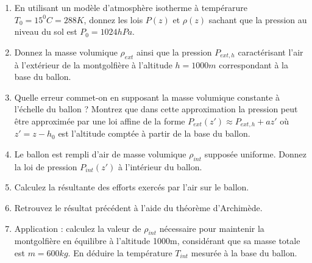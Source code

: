 \begin{enumerate}

\item En utilisant un modèle d'atmosphère isotherme à tempérarure $T_0 =15^0C = 288K$, donnez les lois $P(z)$ et $\rho(z)$ sachant que la pression au niveau du sol est $P_0 = 1024 hPa$.



\item Donnez la masse volumique 
$\rho_{ext}$ ainsi que la pression $P_{ext,h}$ caractérisant l'air à l'extérieur 
de la montgolfière à l'altitude $h = 1000m$ correspondant à la base du ballon.


\item
Quelle erreur commet-on en supposant la masse volumique constante à l'échelle du ballon ? 
Montrez que dans cette approximation la pression peut être approximée par une loi affine
de la forme $P_{ext}(z') \approx P_{ext,h}+a z'$ où $z' = z-h_0$ est l'altitude comptée à partir
de la base du ballon.

  
\item Le ballon est rempli d'air de masse volumique $\rho_{int}$ supposée uniforme.
Donnez la loi de pression $P_{int}(z')$ à l'intérieur du ballon.


\item Calculez la résultante des efforts exercés par l'air sur le ballon.


\item Retrouvez le résultat précédent à l'aide du théorème d'Archimède.


\item Application : calculez la valeur de $\rho_{int}$ nécessaire pour 
maintenir la montgolfière en équilibre à l'altitude 1000m, considérant que 
sa masse totale est $m=600kg$. En déduire la température $T_{int}$
mesurée à la base du ballon.




\end{enumerate} 



